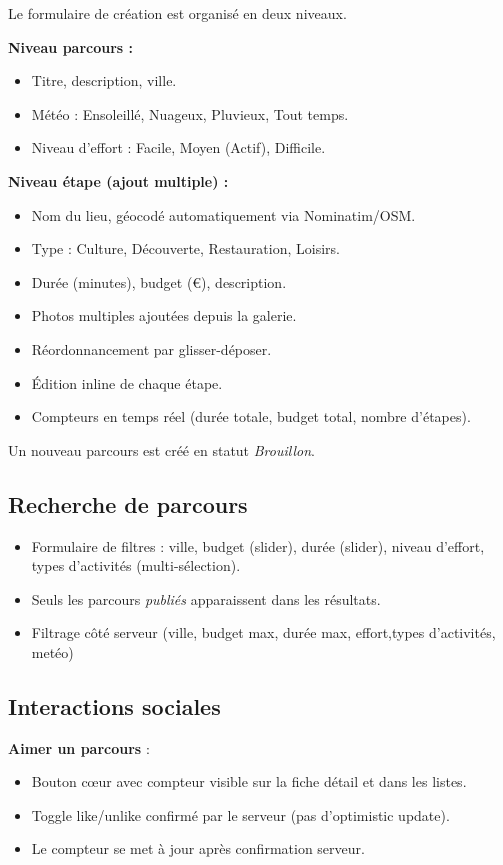 \documentclass[11pt,a4paper]{article}
\begin{document}
Le formulaire de création est organisé en deux niveaux.

\textbf{Niveau parcours :}
\begin{itemize}
  \item Titre, description, ville.
  \item Météo : Ensoleillé, Nuageux, Pluvieux, Tout temps.
  \item Niveau d'effort : Facile, Moyen (Actif), Difficile.
\end{itemize}

\textbf{Niveau étape (ajout multiple) :}
\begin{itemize}
  \item Nom du lieu, géocodé automatiquement via Nominatim/OSM.
  \item Type : Culture, Découverte, Restauration, Loisirs.
  \item Durée (minutes), budget (€), description.
  \item Photos multiples ajoutées depuis la galerie.
  \item Réordonnancement par glisser-déposer.
  \item Édition inline de chaque étape.
  \item Compteurs en temps réel (durée totale, budget total, nombre d'étapes).
\end{itemize}

Un nouveau parcours est créé en statut \textit{Brouillon}.

\subsection{Recherche de parcours}

\begin{itemize}
  \item Formulaire de filtres : ville, budget (slider), durée (slider), niveau d'effort,
    types d'activités (multi-sélection).
  \item Seuls les parcours \textit{publiés} apparaissent dans les résultats.
  \item Filtrage côté serveur (ville, budget max, durée max, effort,types d'activités, metéo) 
\end{itemize}

\subsection{Interactions sociales}

\textbf{Aimer un parcours} :
\begin{itemize}
  \item Bouton cœur avec compteur visible sur la fiche détail et dans les listes.
  \item Toggle like/unlike confirmé par le serveur (pas d'optimistic update).
  \item Le compteur se met à jour après confirmation serveur.
\end{itemize}
\end{document}

